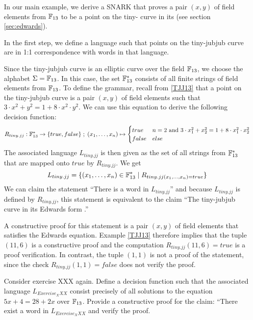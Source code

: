 \begin{example}\label{ex:tiny-jubjub} In our main example, we derive a SNARK that proves a pair $(x,y)$ of field elements from $\mathbb{F}_{13}$ to be a point on the tiny- curve in its  (see section \ref{sec:edwards}).

In the first step, we define a language such that points on the tiny-jubjub curve are in 1:1 correspondence with words in that language.

Since the tiny-jubjub curve is an elliptic curve over the field $\mathbb{F}_{13}$, we choose the alphabet $\Sigma = \mathbb{F}_{13}$. In this case, the set $\mathbb{F}_{13}^*$ consists of all finite strings of field elements from $\mathbb{F}_{13}$. To define the grammar, recall from \ref{TJJ13} that a point on the tiny-jubjub curve is a pair $(x,y)$ of field elements such that $3\cdot x^2 + y^2 = 1+ 8\cdot x^2\cdot y^2$. We can use this equation to derive the following decision function:
$$
R_{tiny.jj} : \mathbb{F}_{13}^* \to \{true, false\}\;;\;
(x_1,\ldots,x_n) \mapsto
\begin{cases}
true & n=2 \text{ and } 3\cdot x_1^2 + x_2^2 = 1+ 8\cdot x_1^2\cdot x_2^2\\
false & else
\end{cases}
$$
The associated language $L_{tiny.jj}$ is then given as the set of all strings from $\mathbb{F}_{13}^*$ that are mapped onto $true$ by $R_{tiny.jj}$. We get
$$
L_{tiny.jj} = \{(x_1,\ldots,x_n)\in \mathbb{F}_{13}^*\;|\; R_{tiny.jj(x_1,\ldots,x_n)=true}\}
$$
We can claim the statement ``There is a word in $L_{tiny.jj}$'' and because $L_{tiny.jj}$ is defined by $R_{tiny.jj}$, this statement is equivalent to the claim ``The tiny-jubjub curve in its Edwards form .'' 

A constructive proof for this statement is a pair $(x,y)$ of field elements that satisfies the Edwards equation. Example \ref{TJJ13} therefore implies that the tuple $(11,6)$ is a constructive proof and the computation $R_{tiny.jj}(11,6)=true$ is a proof verification. In contrast, the tuple $(1,1)$ is not a proof of the statement, since the check $R_{tiny.jj}(1,1)=false$ does not verify the proof.
\end{example}
\begin{exercise} Consider exercise XXX again. Define a decision function such that the associated language $L_{Exercise_XXX}$ consist precisely of all solutions to the equation $5x + 4 = 28 + 2x$ over $\mathbb{F}_{13}$. Provide a constructive proof for the claim: ``There exist a word in $L_{Exercise_XXX}$ and verify the proof.  
\end{exercise}
